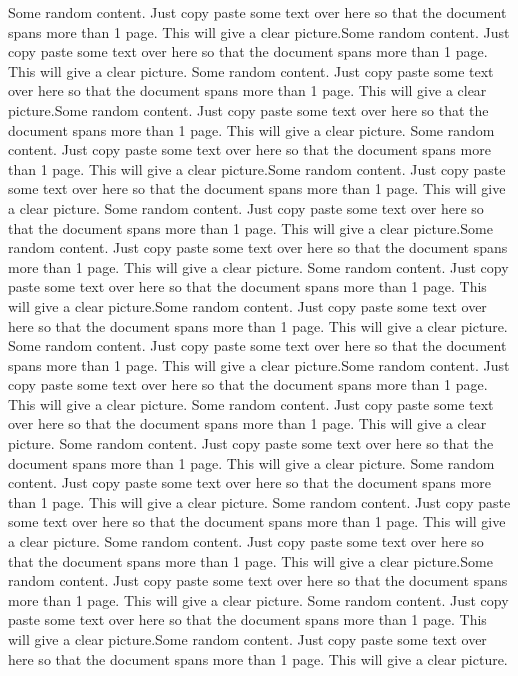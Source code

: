 \documentclass{article}
\begin{document}
	Some random content. Just copy paste some text over here so that the document spans more than 1 page. This will give a clear picture.Some random content. Just copy paste some text over here so that the document spans more than 1 page. This will give a clear picture.
	Some random content. Just copy paste some text over here so that the document spans more than 1 page. This will give a clear picture.Some random content. Just copy paste some text over here so that the document spans more than 1 page. This will give a clear picture.
	Some random content. Just copy paste some text over here so that the document spans more than 1 page. This will give a clear picture.Some random content. Just copy paste some text over here so that the document spans more than 1 page. This will give a clear picture.
	Some random content. Just copy paste some text over here so that the document spans more than 1 page. This will give a clear picture.Some random content. Just copy paste some text over here so that the document spans more than 1 page. This will give a clear picture.
	Some random content. Just copy paste some text over here so that the document spans more than 1 page. This will give a clear picture.Some random content. Just copy paste some text over here so that the document spans more than 1 page. This will give a clear picture.
	Some random content. Just copy paste some text over here so that the document spans more than 1 page. This will give a clear picture.Some random content. Just copy paste some text over here so that the document spans more than 1 page. This will give a clear picture.
	Some random content. Just copy paste some text over here so that the document spans more than 1 page. This will give a clear picture.
	Some random content. Just copy paste some text over here so that the document spans more than 1 page. This will give a clear picture.
	Some random content. Just copy paste some text over here so that the document spans more than 1 page. This will give a clear picture.
	Some random content. Just copy paste some text over here so that the document spans more than 1 page. This will give a clear picture.
	Some random content. Just copy paste some text over here so that the document spans more than 1 page. This will give a clear picture.Some random content. Just copy paste some text over here so that the document spans more than 1 page. This will give a clear picture.
	Some random content. Just copy paste some text over here so that the document spans more than 1 page. This will give a clear picture.Some random content. Just copy paste some text over here so that the document spans more than 1 page. This will give a clear picture.
\end{document}

